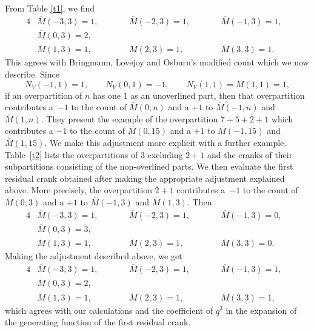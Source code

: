 \documentclass[pdftex]{sigma}
\numberwithin{equation}{section}
\begin{document}
From Table \ref{t1}, we find
\begin{alignat*}{4}
&\overline{M}(-3,3)=1,\qquad&&\overline{M}(-2,3)=1,\qquad&&\overline{M}(-1,3)=1,&
\\
&\overline{M}(0,3)=2,&
\\
&\overline{M}(1,3)=1,\qquad&&\overline{M}(2,3)=1,\qquad&&\overline{M}(3,3)=1.&
\end{alignat*}
This agrees with Bringmann, Lovejoy and Osburn's modified count which we now describe. Since
\begin{equation*}%
N_V(-1,1)=1,\qquad N_V(0,1)=-1,\qquad N_V(1,1)=M(1,1)=1,
\end{equation*}
if an overpartition of $n$ has one $1$ as an unoverlined part, then that overpartition contributes a~$-1$ to the count of $\overline{M}(0,n)$ and a $+1$ to $\overline{M}(-1,n)$ and $\overline{M}(1,n)$.
They present the example of the overpartition $7+\overline{5}+\overline{2}+1$ which contributes a $-1$ to the count of $\overline{M}(0,15)$ and a $+1$ to $\overline{M}(-1,15)$ and $\overline{M}(1,15)$. We make this adjustment more explicit with a further example.
Table~\ref{t2} lists the overpartitions of $3$ excluding $\overline{2}+1$ and the cranks of their subpartitions consisting of the non-overlined parts. We then evaluate the first residual crank obtained after making the appropriate adjustment explained above. More precisely, the overpartition $\overline{2}+1$ contributes a~$-1$ to the count of $\overline{M}(0,3)$ and a $+1$ to $\overline{M}(-1,3)$ and $\overline{M}(1,3)$.
Then
\begin{alignat*}{4}
&\overline{M}(-3,3)=1,\qquad&&\overline{M}(-2,3)=1,\qquad&&\overline{M}(-1,3)=0,&
\\
&\overline{M}(0,3)=3,&
\\
&\overline{M}(1,3)=1,\qquad&&\overline{M}(2,3)=1,\qquad&&\overline{M}(3,3)=0.&
\end{alignat*}
Making the adjustment described above, we get
\begin{alignat*}{4}
&\overline{M}(-3,3)=1,\qquad&&\overline{M}(-2,3)=1,\qquad&&\overline{M}(-1,3)=1,&
\\
&\overline{M}(0,3)=2,&
\\
&\overline{M}(1,3)=1,\qquad&&\overline{M}(2,3)=1,\qquad&&\overline{M}(3,3)=1,&
\end{alignat*}
which agrees with our calculations and the coefficient of $q^3$ in the expansion of the generating function of the first residual crank.
\end{document}
